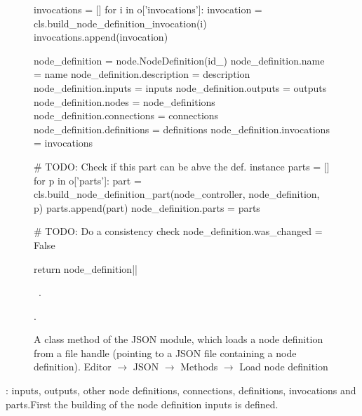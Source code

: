 \documentclass[%
    a4paper,    %
    justified,  %
    nobib,      %
    openany     %
]{tufte-book}
\makeatletter
\renewcommand{\label}[1]{\@tufte@label{##1}}%
\makeatother
\begin{document}
\begin{figure}
\begin{flushleft}
\begin{minipage}{\linewidth}
\begin{pythoncode}
    invocations = []
    for i in o['invocations']:
        invocation = cls.build_node_definition_invocation(i)
        invocations.append(invocation)

    node_definition             = node.NodeDefinition(id_)
    node_definition.name        = name
    node_definition.description = description
    node_definition.inputs      = inputs
    node_definition.outputs     = outputs
    node_definition.nodes       = node_definitions
    node_definition.connections = connections
    node_definition.definitions = definitions
    node_definition.invocations = invocations

    # TODO: Check if this part can be abve the def. instance
    parts = []
    for p in o['parts']:
        part = cls.build_node_definition_part(node_controller, node_definition, p)
        parts.append(part)
    node_definition.parts = parts

    # TODO: Do a consistency check
    node_definition.was_changed = False

    return node_definition|\NWsep|
\end{pythoncode}
\vspace{1.5ex}
\footnotesize
\begin{list}{}{\setlength{\itemsep}{-\parsep}\setlength{\itemindent}{-\leftmargin}}
\item \NWtxtMacroDefBy\ .
\item {\NWtxtMacroNoRef}.

\item{}
\end{list}
\end{minipage}\vspace{4ex}
\end{flushleft}
\caption{A class method of the JSON module, which loads a node definition from a
  file handle (pointing to a JSON file containing a node definition).
  \newline{}\newline{}Editor $\rightarrow$ JSON $\rightarrow$
  Methods $\rightarrow$ Load node definition}
\label{editor:lst:json:methods:load-node-definition}
\end{figure}

: inputs, outputs,
other node definitions, connections, definitions, invocations and parts.First
the building of the node definition inputs is defined.
\end{document}
